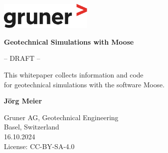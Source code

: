 \begin{titlepage}
    \begin{flushright}
        \includegraphics[width=4.5cm]{img/gruner.pdf}
    \end{flushright}
    \begin{center}
        \vspace*{5cm}

        {\Huge\textbf{Geotechnical Simulations with Moose}}

        \vspace{5cm}

        \large{-- DRAFT --}

        \vfill

        \large{This whitepaper collects information and code \\
            for geotechnical simulations with the software Moose.}

        \vfill

        \textbf{Jörg Meier}

        \vspace{0.8cm}

        Gruner AG, Geotechnical Engineering\\
        Basel, Switzerland\\

        \vspace{1cm}
        16.10.2024\\

        \vspace{1cm}
        License: CC-BY-SA-4.0

    \end{center}
\end{titlepage}